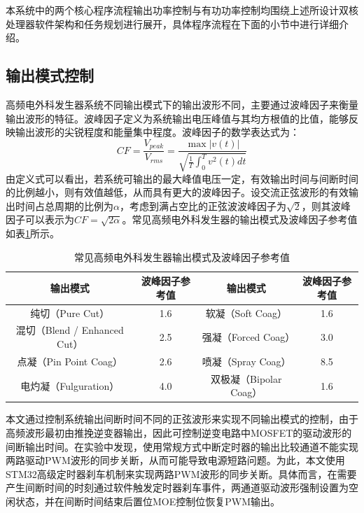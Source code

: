 本系统中的两个核心程序流程输出功率控制与有功功率控制均围绕上述所设计双核处理器软件架构和任务规划进行展开，具体程序流程在下面的小节中进行详细介绍。

\subsection{输出模式控制}
高频电外科发生器系统不同输出模式下的输出波形不同，主要通过波峰因子来衡量输出波形的特征。波峰因子定义为系统输出电压峰值与其均方根值的比值，能够反映输出波形的尖锐程度和能量集中程度。波峰因子的数学表达式为：
\begin{equation}
	CF = \frac{V_{peak}}{V_{rms}} = \frac{\max |v(t)|}{\sqrt{\frac{1}{T} \int_{0}^{T} v^2(t) dt}}
\end{equation}
由定义式可以看出，若系统可输出的最大峰值电压一定，有效输出时间与间断时间的比例越小，则有效值越低，从而具有更大的波峰因子。设交流正弦波形的有效输出时间占总周期的比例为$\alpha$，考虑到满占空比的正弦波波峰因子为$\sqrt{2}$，则其波峰因子可以表示为$CF = \sqrt{2\alpha}$。常见高频电外科发生器的输出模式及波峰因子参考值如表\ref{esu_cf}所示。
\begin{table}[htbp]
	\caption{\label{esu_cf}常见高频电外科发生器输出模式及波峰因子参考值}
	\centering
	\small
	\setlength{\tabcolsep}{5pt}
	\begin{tabular}{c c c c}
		\hline
		输出模式                     & 波峰因子参考值 & 输出模式              & 波峰因子参考值 \\
		\hline
		纯切（Pure Cut）             & 1.6     & 软凝（Soft Coag）     & 1.6     \\
		混切（Blend / Enhanced Cut） & 2.5     & 强凝（Forced Coag）   & 3.0     \\
		点凝（Pin Point Coag）       & 2.6     & 喷凝（Spray Coag）    & 8.5     \\
		电灼凝（Fulguration）         & 4.0     & 双极凝（Bipolar Coag） & 1.6     \\
		\hline
	\end{tabular}
\end{table}

本文通过控制系统输出间断时间不同的正弦波形来实现不同输出模式的控制，由于高频波形最初由推挽逆变器输出，因此可控制逆变电路中MOSFET的驱动波形的间断输出时间。在实验中发现，使用常规方式中断定时器的输出比较通道不能实现两路驱动PWM波形的同步关断，从而可能导致电源短路问题。为此，本文使用STM32高级定时器刹车机制来实现两路PWM波形的同步关断。具体而言，在需要产生间断时间的时刻通过软件触发定时器刹车事件，两通道驱动波形强制设置为空闲状态，并在间断时间结束后置位MOE控制位恢复PWM输出。

